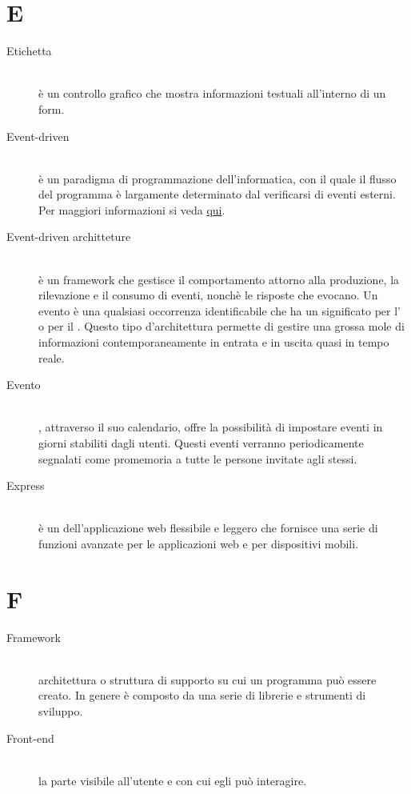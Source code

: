 \documentclass[12pt,a4paper]{article}
\begin{document}
\newpage

\section{E}

\begin{description}
\item[Etichetta] 
\hfill\\ è un controllo grafico che mostra informazioni testuali all'interno di un form.

\item[Event-driven] 
\hfill\\ è un paradigma di programmazione dell'informatica, con il quale il flusso del programma è largamente determinato dal verificarsi di eventi esterni. Per maggiori informazioni si veda \href{https://it.wikipedia.org/wiki/Programmazione_a_eventi}{qui}.

\item[Event-driven architteture] 
\hfill\\è un framework che gestisce il comportamento attorno alla produzione, la rilevazione e il consumo di eventi, nonchè le risposte che evocano. Un evento è una qualsiasi occorrenza identificabile che ha un significato per l' o per il . Questo tipo d'architettura  permette di gestire  una grossa mole di informazioni contemporaneamente  in entrata e in uscita quasi in tempo reale.

\item[Evento] 
\hfill\\ , attraverso il suo calendario, offre la possibilità di impostare eventi in giorni stabiliti dagli utenti. Questi eventi verranno periodicamente segnalati come promemoria a tutte le persone invitate agli stessi.

\item[Express] 
\hfill\\è un  dell'applicazione web  flessibile e leggero che fornisce una serie di funzioni avanzate per le applicazioni web e per dispositivi mobili.
\end{description}

\newpage

\section{F}

\begin{description}
\item[Framework] 
\hfill\\ architettura o struttura di supporto su cui un programma può essere creato. In genere è composto da una serie di librerie e strumenti di sviluppo.

\item[Front-end] 
\hfill\\la parte visibile all'utente e con cui egli può interagire.
\end{description}
\end{document}
